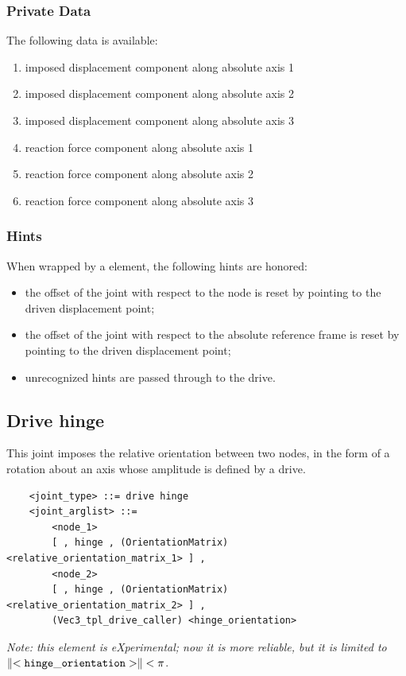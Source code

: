 \subsubsection{Private Data}
The following data is available:
\begin{enumerate}
\item {} imposed displacement component along absolute axis 1
\item {} imposed displacement component along absolute axis 2
\item {} imposed displacement component along absolute axis 3
\item {} reaction force component along absolute axis 1
\item {} reaction force component along absolute axis 2
\item {} reaction force component along absolute axis 3
\end{enumerate}

\subsubsection{Hints}
When wrapped by a  element, the following hints are honored:
\begin{itemize}
\item {} the offset of the joint
with respect to the node is reset by pointing 
to the driven displacement point;
\item {} the offset of the joint
with respect to the absolute reference frame is reset by pointing
to the driven displacement point;
\item unrecognized hints are passed through to the  drive.
\end{itemize}



\subsection{Drive hinge}
\label{sec:EL:JOINT:DRIVEHINGE}
This joint imposes the relative orientation between two nodes,
in the form of a rotation about an axis whose amplitude is defined
by a drive.
\begin{verbatim}
    <joint_type> ::= drive hinge
    <joint_arglist> ::= 
        <node_1>
        [ , hinge , (OrientationMatrix) <relative_orientation_matrix_1> ] ,
        <node_2> 
        [ , hinge , (OrientationMatrix) <relative_orientation_matrix_2> ] ,
        (Vec3_tpl_drive_caller) <hinge_orientation>
\end{verbatim}
\emph{Note: this element is eXperimental; now it is more reliable, 
but it is limited to $\left\| \tt <hinge\_orientation> \right\| < \pi$}.

